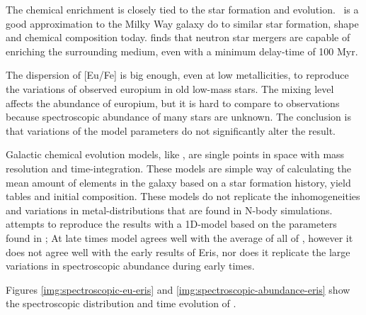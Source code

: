 The chemical enrichment is closely tied to the star formation and evolution. \eris\ is a good approximation to the Milky Way galaxy do to similar star formation, shape and chemical composition today.
 finds that neutron star mergers are capable of enriching the surrounding medium, even with a minimum delay-time of 100 Myr.

The dispersion of [Eu/Fe] is big enough, even at low metallicities, to reproduce the variations of observed europium in old low-mass stars.
The mixing level affects the abundance of europium, but it is hard to compare to observations because spectroscopic abundance of many stars are unknown.
The conclusion is that variations of the model parameters do not significantly alter the result.

Galactic chemical evolution models, like \omegamodel, are single points in space with mass resolution and time-integration. These models are simple way of calculating the mean amount of elements in the galaxy based on a star formation history, yield tables and initial composition.
These models do not replicate the inhomogeneities and variations in metal-distributions that are found in N-body simulations.
 attempts to reproduce the results with a 1D-model based on the parameters found in \eris;
At late times model agrees well with the average of all of \eris, however it does not agree well with the early results of Eris, nor does it replicate the large variations in spectroscopic abundance during early times.

Figures \ref{img:spectroscopic-eu-eris} and \ref{img:spectroscopic-abundance-eris} show the spectroscopic distribution and time evolution of \eris.

\begin{figure}[h]
  \begin{minipage}[t][][t]{\textwidth}
    \setlength\figwidth{\textwidth}
    
  \end{minipage}
\end{figure}
\begin{figure}[h]
  \begin{minipage}[t][][t]{\textwidth}
    \setlength{}
    
  \end{minipage}
\end{figure}

\iffalse
{}

